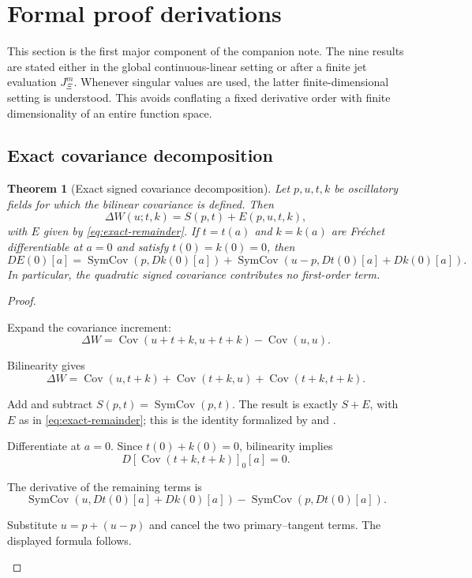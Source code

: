 \documentclass[12pt]{article}
\theoremstyle{plain}
\newtheorem{theorem}{Theorem}[section]
\theoremstyle{definition}
\theoremstyle{remark}
\newcommand{\Cov}{\operatorname{Cov}}
\newcommand{\SymCov}{\operatorname{SymCov}}
\begin{document}
\section{Formal proof derivations}\label{sec:formal-derivations}
This section is the first major component of the companion note. The nine results are stated either in the global continuous-linear setting or after a finite jet evaluation \(J^m_{\Xi}\). Whenever singular values are used, the latter finite-dimensional setting is understood. This avoids conflating a fixed derivative order with finite dimensionality of an entire function space.

\subsection{Exact covariance decomposition}
\begin{theorem}[Exact signed covariance decomposition]\label{thm:covsplit}
Let \(p,u,t,k\) be oscillatory fields for which the bilinear covariance is defined. Then
\[
\boxed{\Delta W(u;t,k)=S(p,t)+E(p,u,t,k),}
\]
with \(E\) given by \eqref{eq:exact-remainder}. If \(t=t(a)\) and \(k=k(a)\) are Fr\'echet differentiable at \(a=0\) and satisfy \(t(0)=k(0)=0\), then
\[
\boxed{
DE(0)[a]
=\SymCov(p,Dk(0)[a])
+\SymCov(u-p,Dt(0)[a]+Dk(0)[a]).
}
\]
In particular, the quadratic signed covariance contributes no first-order term.
\end{theorem}

\begin{proof}
\begin{prooflines}
\item Expand the covariance increment:
\[
\Delta W=\Cov(u+t+k,u+t+k)-\Cov(u,u).
\]
\item Bilinearity gives
\[
\Delta W=\Cov(u,t+k)+\Cov(t+k,u)+\Cov(t+k,t+k).
\]
\item Add and subtract \(S(p,t)=\SymCov(p,t)\). The result is exactly \(S+E\), with \(E\) as in \eqref{eq:exact-remainder}; this is the identity formalized by  and  \cite{OpenAILeanRepo2026}.
\item Differentiate at \(a=0\). Since \(t(0)+k(0)=0\), bilinearity implies
\[
D\!\left[\Cov(t+k,t+k)\right]_{0}[a]=0.
\]
\item The derivative of the remaining terms is
\[
\SymCov(u,Dt(0)[a]+Dk(0)[a])-\SymCov(p,Dt(0)[a]).
\]
\item Substitute \(u=p+(u-p)\) and cancel the two primary--tangent terms. The displayed formula follows.
\end{prooflines}
\end{proof}
\end{document}
